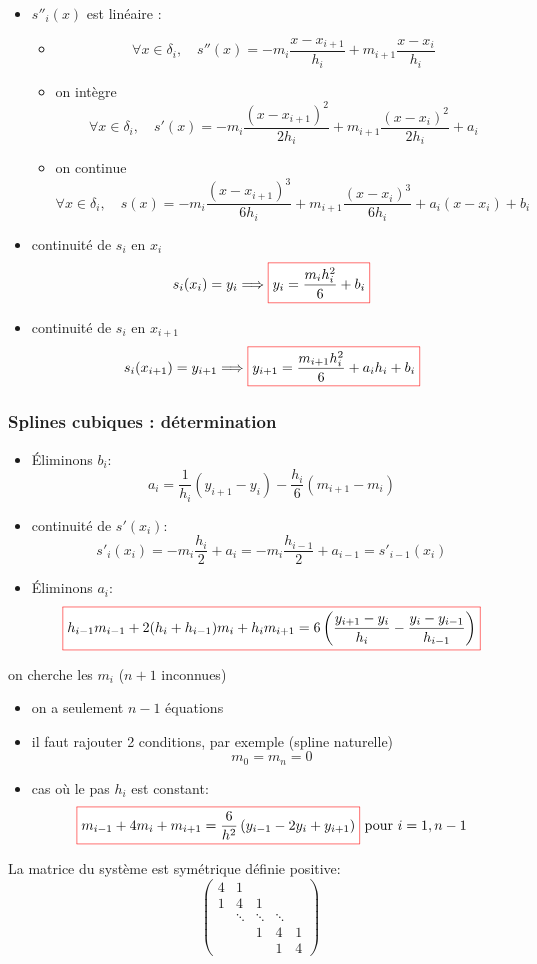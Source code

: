 \documentclass{beamer}
\newcommand{\myredbox}[1]{\fcolorbox{red}{white}{$\displaystyle#1$}}
\begin{document}
 \begin{frame}
 \begin{itemize}
\item $s''_i(x)$ est linéaire :
 \begin{itemize}
\item \[\forall x\in \delta_i,\quad s''(x)=-m_{i} \frac{x-x_{i+1}}{h_i}+m_{i+1} \frac{x-x_{i}}{h_i}\]
\item on intègre 
\[\forall x\in \delta_i,\quad  s'(x)=-m_{i} \frac{(x-x_{i+1})^2}{2h_i}+m_{i+1} \frac{(x-x_{i})^2}{2h_i}+a_i\]
\item on continue
\[\forall x\in \delta_i,\quad  s(x)=-m_{i} \frac{(x-x_{i+1})^3}{6h_i}+m_{i+1} \frac{(x-x_{i})^3}{6h_i}+a_i(x-x_i)+b_i\]
\end{itemize}
\item continuité de $s_i$ en $x_i$
\[s_i(x_i)=y_i \Longrightarrow \myredbox{y_i=\frac{m_i h_i^2}{6}+b_i}\]
\item continuité de $s_i$ en $x_{i+1}$
\[s_i(x_{i+1})=y_{i+1} \Longrightarrow \myredbox{ y_{i+1}=\frac{m_{i+1} h_i^2}{6}+a_ih_i+b_i}\]
\end{itemize}
\end{frame}

\begin{frame}
 \frametitle{Splines cubiques : détermination}
 
 \begin{itemize}
 \item Éliminons $b_i$:
 \[a_i=\frac 1{h_i}\left(y_{i+1}-y_i\right)-\frac {h_i}6\left(m_{i+1}-m_i\right)\]
 \item continuité de $s'(x_i)$:
 \[s'_i(x_i)=-m_i\frac{h_i}{2}+a_i=-m_i\frac{h_{i-1}}{2}+a_{i-1}=s'_{i-1}(x_i)\]
 \item Éliminons $a_i$:
 \[\myredbox{ h_{i-1}m_{i-1}+2(h_i+h_{i-1})m_i+h_i m_{i+1}=6\left(\frac {y_{i+1}-y_i}{h_i}-\frac {y_{i}-y_{i-1}}{h_{i-1}}\right)}\]
\end{itemize}
\end{frame}

\begin{frame}

on cherche les $m_i$ ($n+1$ inconnues)
\begin{itemize}
 \item on a seulement $n-1$ équations
 \item il faut rajouter 2 conditions, par exemple (spline naturelle)
 \[m_0=m_n=0\]
 \item cas où le pas $h_i$ est constant:
 \[\myredbox{ m_{i-1}+4m_i+m_{i+1}=\frac 6{h^2}\left(y_{i-1}-2y_i+y_{i+1}\right)} \mbox{ pour }i=1,n-1\]
\end{itemize}
La matrice du système est symétrique définie positive:
\[\left(\begin{array}{ccccc}
4 & 1 & &&\\
1 & 4 & 1 &&\\
 & \ddots & \ddots &\ddots&\\
&& 1 & 4 & 1 \\
&& & 1 & 4
\end{array}\right)
\]

\end{frame}
\end{document}
